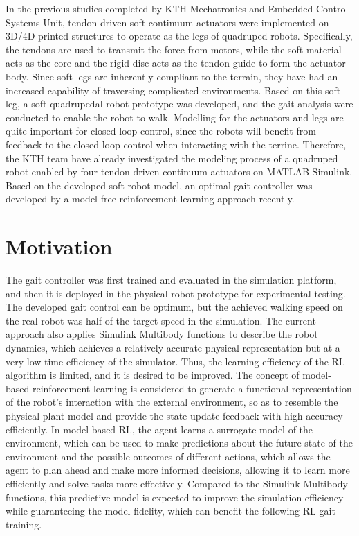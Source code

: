 In the previous studies\cite{thorapallimuralidharanContinuumActuatorBased2020} completed by KTH Mechatronics and Embedded Control Systems Unit, tendon-driven soft continuum actuators were implemented on 3D/4D printed structures to operate as the legs of quadruped robots. Specifically, the tendons are used to transmit the force from motors, while the soft material acts as the core and the rigid disc acts as the tendon guide to form the actuator body. Since soft legs are inherently compliant to the terrain, they have had an increased capability of traversing complicated environments. Based on this soft leg, a soft quadrupedal robot prototype was developed, and the gait analysis were conducted to enable the robot to walk\cite{daneliaStructureGaitOptimizationof2021}. Modelling for the actuators and legs are quite important for closed loop control, since the robots will benefit from feedback to the closed loop control when interacting with the terrine. Therefore, the KTH team\cite{muralidharanSoftQuadrupedRobot2021} have already investigated the modeling process of a quadruped robot enabled by four tendon-driven continuum actuators on MATLAB Simulink. Based on the developed soft robot model, an optimal gait controller was developed by a model-free reinforcement learning approach\cite{jiSynthesizingOptimalGait2022} recently.

\section{Motivation}
 The gait controller was first trained and evaluated in the simulation platform, and then it is deployed in the physical robot prototype for experimental testing. The developed gait control can be optimum, but the achieved walking speed on the real robot was half of the target speed in the simulation\cite{jiSynthesizingOptimalGait2022}. The current approach also applies Simulink Multibody functions to describe the robot dynamics, which achieves a relatively accurate physical representation but at a very low time efficiency of the simulator. Thus, the learning efficiency of the \ac{RL} algorithm is limited, and it is desired to be improved. The concept of model-based reinforcement learning is considered to generate a functional representation of the robot’s interaction with the external environment, so as to resemble the physical plant model and provide the state update feedback with high accuracy efficiently\cite{rayModelBasedReinforcementLearning2010}. In model-based \ac{RL}, the agent learns a surrogate model of the environment, which can be used to make predictions about the future state of the environment and the possible outcomes of different actions, which allows the agent to plan ahead and make more informed decisions, allowing it to learn more efficiently and solve tasks more effectively\cite{polydorosSurveyModelBasedReinforcement2017}. Compared to the Simulink Multibody functions, this predictive model is expected to improve the simulation efficiency while guaranteeing the model fidelity, which can benefit the following \ac{RL} gait training. 
 
